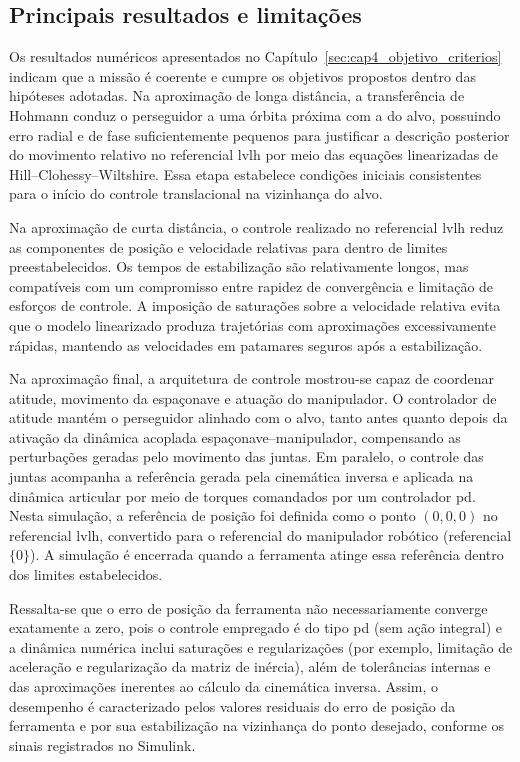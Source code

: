 \subsection{Principais resultados e limitações}
\label{sec:cap5_resultados_limitacoes}

Os resultados numéricos apresentados no Capítulo~\ref{sec:cap4_objetivo_criterios} indicam que a missão é coerente e cumpre os objetivos propostos dentro das hipóteses adotadas.
Na aproximação de longa distância, a transferência de Hohmann conduz o perseguidor a uma órbita próxima com a do alvo, possuindo erro radial e de fase suficientemente pequenos para justificar a descrição posterior do movimento relativo no referencial \gls{lvlh} por meio das equações linearizadas de Hill--Clohessy--Wiltshire.
Essa etapa estabelece condições iniciais consistentes para o início do controle translacional na vizinhança do alvo.

Na aproximação de curta distância, o controle realizado no referencial \gls{lvlh} reduz as componentes de posição e velocidade relativas para dentro de limites preestabelecidos.
Os tempos de estabilização são relativamente longos, mas compatíveis com um compromisso entre rapidez de convergência e limitação de esforços de controle.
A imposição de saturações sobre a velocidade relativa evita que o modelo linearizado produza trajetórias com aproximações excessivamente rápidas, mantendo as velocidades em patamares seguros após a estabilização.

Na aproximação final, a arquitetura de controle mostrou-se capaz de coordenar atitude, movimento da espaçonave e atuação do manipulador.
O controlador de atitude mantém o perseguidor alinhado com o alvo, tanto antes quanto depois da ativação da dinâmica acoplada espaçonave--manipulador, compensando as perturbações geradas pelo movimento das juntas.
Em paralelo, o controle das juntas acompanha a referência gerada pela cinemática inversa e aplicada na dinâmica articular por meio de torques comandados por um controlador \gls{pd}.
Nesta simulação, a referência de posição foi definida como o ponto $(0,0,0)$ no referencial \gls{lvlh}, convertido para o referencial do manipulador robótico (referencial $\{0\}$).
A simulação é encerrada quando a ferramenta atinge essa referência dentro dos limites estabelecidos.

Ressalta-se que o erro de posição da ferramenta não necessariamente converge exatamente a zero, pois o controle empregado é do tipo \gls{pd} (sem ação integral) e a dinâmica numérica inclui saturações e regularizações (por exemplo, limitação de aceleração e regularização da matriz de inércia), além de tolerâncias internas e das aproximações inerentes ao cálculo da cinemática inversa.
Assim, o desempenho é caracterizado pelos valores residuais do erro de posição da ferramenta e por sua estabilização na vizinhança do ponto desejado, conforme os sinais registrados no Simulink.

